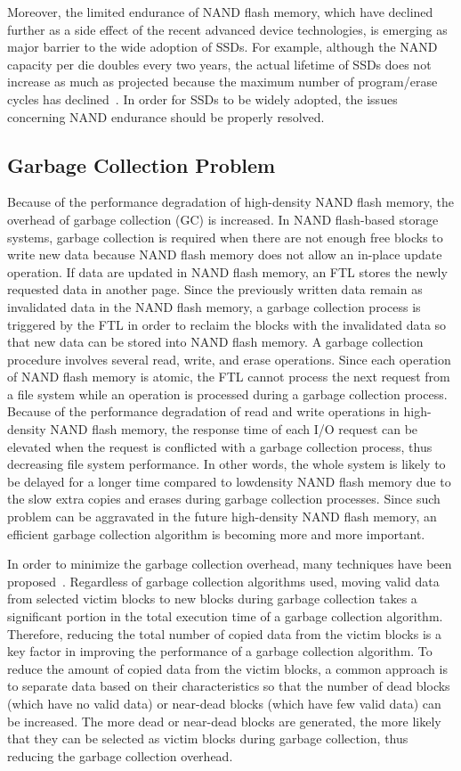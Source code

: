 Moreover, the limited endurance of NAND flash memory, which have declined
further as a side effect of the recent advanced device technologies,
is emerging as major barrier to the wide adoption of SSDs. For example,
although the NAND capacity per die doubles every two years, the actual 
lifetime of SSDs does not increase as much as projected because the
maximum number of program/erase cycles has declined~\cite{MooresLaw}.
In order for SSDs to be widely adopted, the issues concerning NAND endurance 
should be properly resolved.

\subsection{Garbage Collection Problem}
Because of the performance degradation of high-density NAND flash
memory, the overhead of garbage collection (GC) is increased. In NAND
flash-based storage systems, garbage collection is required when there are
not enough free blocks to write new data because NAND flash memory does
not allow an in-place update operation. If data are updated in NAND flash
memory, an FTL stores the newly requested data in another page. Since
the previously written data remain as invalidated data in the NAND flash
memory, a garbage collection process is triggered by the FTL in order to reclaim
the blocks with the invalidated data so that new data can be stored into
NAND flash memory. A garbage collection procedure involves several read,
write, and erase operations. Since each operation of NAND flash memory is
atomic, the FTL cannot process the next request from a file system while an
operation is processed during a garbage collection process. 
Because of the performance degradation of read and write
operations in high-density NAND flash memory, the response time of each
I/O request can be elevated when the request is conflicted with a garbage
collection process, thus decreasing file system performance. In other words,
the whole system is likely to be delayed for a longer time compared to lowdensity
NAND flash memory due to the slow extra copies and erases during
garbage collection processes. Since such problem can be aggravated in the
future high-density NAND flash memory, an efficient garbage collection algorithm
is becoming more and more important.

In order to minimize the garbage collection overhead, many techniques
have been proposed~\cite{FTL}. Regardless of garbage collection algorithms used,
moving valid data from selected victim blocks to new blocks during garbage
collection takes a significant portion in the total execution time of a garbage
collection algorithm. Therefore, reducing the total number of copied data
from the victim blocks is a key factor in improving the performance of a
garbage collection algorithm. To reduce the amount of copied data from the
victim blocks, a common approach is to separate data based on their characteristics
so that the number of dead blocks (which have no valid data) or
near-dead blocks (which have few valid data) can be increased. The more
dead or near-dead blocks are generated, the more likely that they can be selected
as victim blocks during garbage collection, thus reducing the garbage
collection overhead.

